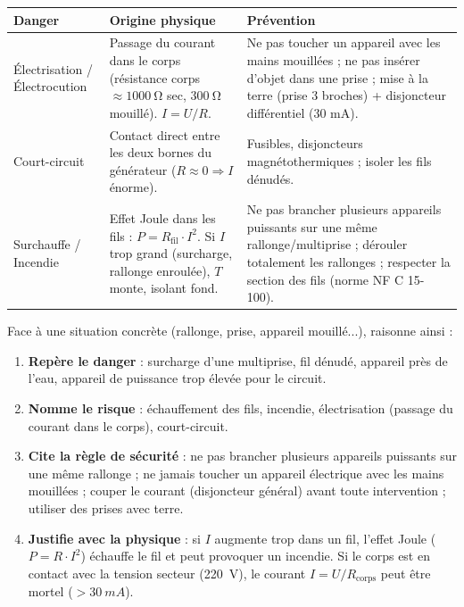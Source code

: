 \documentclass[11pt]{article}
\newcommand{\cle}[1]{{\popxbold\color{popdark}#1}}
\begin{document}
\begin{aretenir}
\begin{center}
\begin{tabularx}{\linewidth}{|l|X|X|}\hline
\rowcolor{poporangeL}
\textbf{Danger} & \textbf{Origine physique} & \textbf{Prévention} \\ \hline
\cle{Électrisation} / \cle{Électrocution} & Passage du courant dans le corps (résistance corps $\approx \SI{1000}{\ohm}$ sec, $\SI{300}{\ohm}$ mouillé). $I = U/R$. & Ne pas toucher un appareil avec les mains mouillées ; ne pas insérer d'objet dans une prise ; mise à la terre (prise 3 broches) + disjoncteur différentiel (30 mA). \\ \hline
\cle{Court-circuit} & Contact direct entre les deux bornes du générateur ($R \approx 0 \Rightarrow I$ énorme). & Fusibles, disjoncteurs magnétothermiques ; isoler les fils dénudés. \\ \hline
\cle{Surchauffe} / \cle{Incendie} & Effet Joule dans les fils : $P = R_{\text{fil}} \cdot I^{2}$. Si $I$ trop grand (surcharge, rallonge enroulée), $T$ monte, isolant fond. & Ne pas brancher plusieurs appareils puissants sur une même rallonge/multiprise ; dérouler totalement les rallonges ; respecter la section des fils (norme NF C 15-100). \\ \hline
\end{tabularx}
\end{center}
\end{aretenir}

\begin{methode}
Face à une situation concrète (rallonge, prise, appareil mouillé...), raisonne ainsi :
\begin{enumerate}
\item \textbf{Repère le danger} : surcharge d'une multiprise, fil dénudé, appareil près de l'eau, appareil de puissance trop élevée pour le circuit.
\item \textbf{Nomme le risque} : échauffement des fils, incendie, électrisation (passage du courant dans le corps), court-circuit.
\item \textbf{Cite la règle de sécurité} : ne pas brancher plusieurs appareils puissants sur une même rallonge ; ne jamais toucher un appareil électrique avec les mains mouillées ; couper le courant (disjoncteur général) avant toute intervention ; utiliser des prises avec terre.
\item \textbf{Justifie avec la physique} : si $I$ augmente trop dans un fil, l'effet Joule ($P = R \cdot I^{2}$) échauffe le fil et peut provoquer un incendie. Si le corps est en contact avec la tension secteur (\SI{220}{V}), le courant $I = U/R_{\text{corps}}$ peut être mortel ($> \SI{30}{mA}$).
\end{enumerate}
\end{methode}
\end{document}
